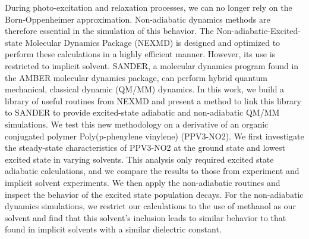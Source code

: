 During photo-excitation and relaxation processes, we can no longer rely on the Born-Oppenheimer approximation.
  Non-adiabatic dynamics methods are therefore essential in the simulation of this behavior.
  The Non-adiabatic-Excited-state Molecular Dynamics Package (NEXMD) is designed and optimized to perform these calculations in a highly efficient manner. However, its use is restricted to implicit solvent.
  SANDER, a molecular dynamics program found in the AMBER molecular dynamics package, can perform hybrid quantum mechanical, classical dynamic (QM/MM) dynamics.
    In this work, we build a library of useful routines from NEXMD and present a method to link this library to SANDER to provide excited-state adiabatic and non-adiabatic QM/MM simulations.
  We test this new methodology on a derivative of an organic conjugated polymer Poly(p-phenylene vinylene) (PPV3-NO2).
  We first investigate the steady-state characteristics of PPV3-NO2 at the ground state and lowest excited state in varying solvents. This analysis only required excited state adiabatic calculations, and we compare the results to those from experiment and implicit solvent experiments.
  We then apply the non-adiabatic routines and inspect the behavior of the excited state population decays.
For the non-adiabatic dynamics simulations, we restrict our calculations to the use of methanol as our solvent and find that this solvent's inclusion leads to similar behavior to that found in implicit solvents with a similar dielectric constant.
